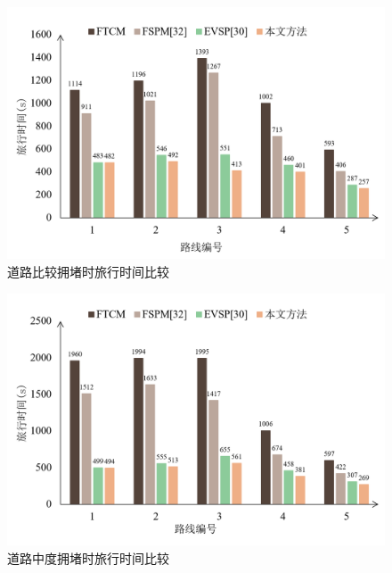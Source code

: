 
\begin{figure}[H]
	\centering
	\includegraphics[width=\linewidth]{figures/travel_time2.png}
	\caption{道路比较拥堵时旅行时间比较}
	\label{fig:travel_time_relatively_congestion}
\end{figure}


\begin{figure}[H]
	\centering
	\includegraphics[width=\linewidth]{figures/travel_time3.png}
	\caption{道路中度拥堵时旅行时间比较}
	\label{fig:travel_time_moderate_congestion}
\end{figure}

